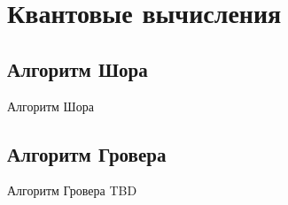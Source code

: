 \section{Квантовые вычисления}
\subsection{Алгоритм Шора}
\begin{frame}{Алгоритм Шора}

\end{frame}

\subsection{Алгоритм Гровера}
\begin{frame}{Алгоритм Гровера}
TBD
\end{frame}
